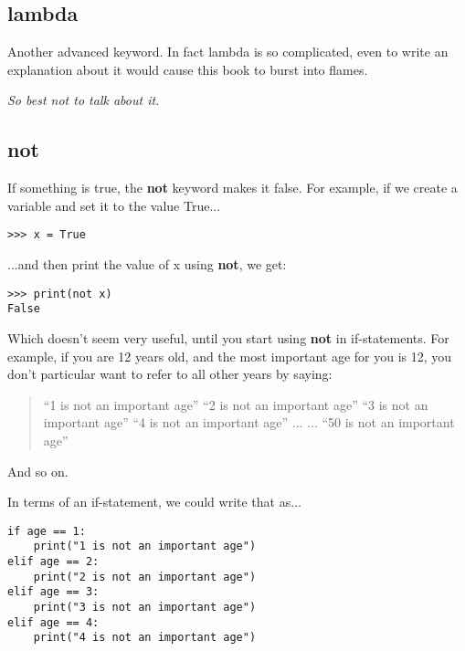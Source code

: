 \subsection*{lambda}

Another advanced keyword. In fact lambda is so complicated, even to write an explanation about it would cause this book to burst into flames.
\par
\emph{So best not to talk about it.}

\subsection*{not}

If something is true, the \textbf{not} keyword makes it false.  For example, if we create a variable  and set it to the value True...

\begin{Verbatim}[frame=single]
>>> x = True
\end{Verbatim}

...and then print the value of x using \textbf{not}, we get:

\begin{Verbatim}[frame=single]
>>> print(not x)
False
\end{Verbatim}

Which doesn't seem very useful, until you start using \textbf{not} in if-statements.  For example, if you are 12 years old, and the most important age for you is 12, you don't particular want to refer to all other years by saying:

\begin{quotation}
``1 is not an important age''
``2 is not an important age''
``3 is not an important age''
``4 is not an important age''
...
...
``50 is not an important age''
\end{quotation}

And so on.
\par\noindent
In terms of an if-statement, we could write that as$\ldots$

\begin{Verbatim}[frame=single]
if age == 1:
    print("1 is not an important age")
elif age == 2:
    print("2 is not an important age")
elif age == 3:
    print("3 is not an important age")
elif age == 4:
    print("4 is not an important age")
\end{Verbatim}

